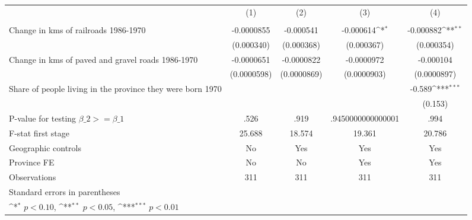 {
\def\sym#1{\ifmmode^{#1}\else\(^{#1}\)\fi}
\begin{tabular}{l*{4}{c}}
\hline\hline
                &\multicolumn{1}{c}{(1)}&\multicolumn{1}{c}{(2)}&\multicolumn{1}{c}{(3)}&\multicolumn{1}{c}{(4)}\\
                &\multicolumn{1}{c}{}&\multicolumn{1}{c}{}&\multicolumn{1}{c}{}&\multicolumn{1}{c}{}\\
\hline
Change in kms of railroads 1986-1970&-0.0000855         &-0.000541         &-0.000614\sym{*}  &-0.000882\sym{**} \\
                &(0.000340)         &(0.000368)         &(0.000367)         &(0.000354)         \\
[1em]
Change in kms of paved and gravel roads 1986-1970&-0.0000651         &-0.0000822         &-0.0000972         &-0.000104         \\
                &(0.0000598)         &(0.0000869)         &(0.0000903)         &(0.0000897)         \\
[1em]
Share of people living in the province they were born 1970&                  &                  &                  &   -0.589\sym{***}\\
                &                  &                  &                  &  (0.153)         \\
\hline
P-value for testing $\beta\_{2} >= \beta\_{1}$&     .526         &     .919         &.9450000000000001         &     .994         \\
F-stat first stage&   25.688         &   18.574         &   19.361         &   20.786         \\
Geographic controls&       No         &      Yes         &      Yes         &      Yes         \\
Province FE     &       No         &       No         &      Yes         &      Yes         \\
Observations    &      311         &      311         &      311         &      311         \\
\hline\hline
\multicolumn{5}{l}{\footnotesize Standard errors in parentheses}\\
\multicolumn{5}{l}{\footnotesize \sym{*} \(p<0.10\), \sym{**} \(p<0.05\), \sym{***} \(p<0.01\)}\\
\end{tabular}
}
